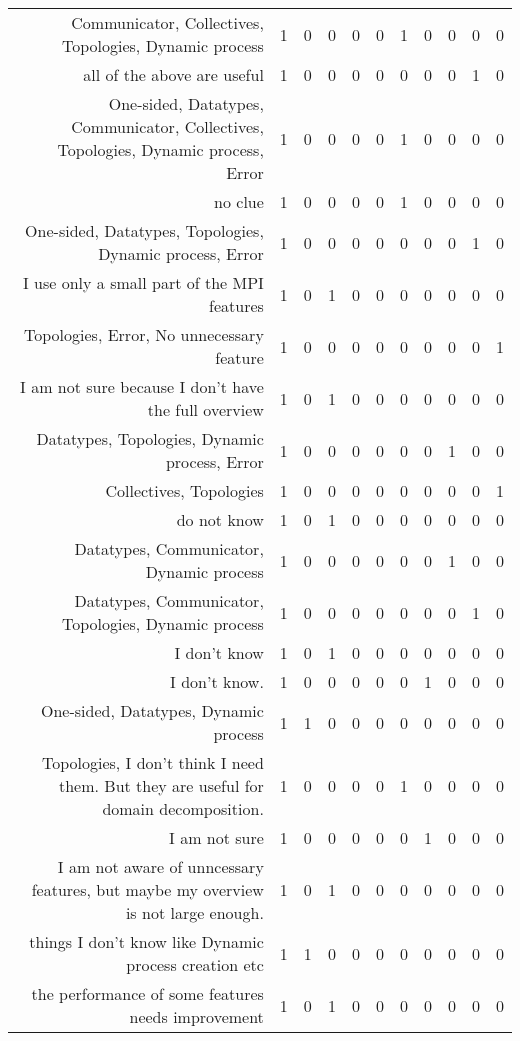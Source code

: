 {\begin{landscape}
\begin{longtable}[htb]{r|c|c|c|c|c|c|c|c|c|c}
{Communicator, Collectives, Topologies, Dynamic process} & 1 & 0 & 0 & 0 & 0 & 1 & 0 & 0 & 0 & 0 \\%
{all of the above are useful} & 1 & 0 & 0 & 0 & 0 & 0 & 0 & 0 & 1 & 0 \\%
{One-sided, Datatypes, Communicator, Collectives, Topologies, Dynamic process, Error} & 1 & 0 & 0 & 0 & 0 & 1 & 0 & 0 & 0 & 0 \\%
{no clue} & 1 & 0 & 0 & 0 & 0 & 1 & 0 & 0 & 0 & 0 \\%
{One-sided, Datatypes, Topologies, Dynamic process, Error} & 1 & 0 & 0 & 0 & 0 & 0 & 0 & 0 & 1 & 0 \\%
{I use only a small part of the MPI features} & 1 & 0 & 1 & 0 & 0 & 0 & 0 & 0 & 0 & 0 \\%
{Topologies, Error, No unnecessary feature} & 1 & 0 & 0 & 0 & 0 & 0 & 0 & 0 & 0 & 1 \\%
{I am not sure because I don't have the full overview} & 1 & 0 & 1 & 0 & 0 & 0 & 0 & 0 & 0 & 0 \\%
{Datatypes, Topologies, Dynamic process, Error} & 1 & 0 & 0 & 0 & 0 & 0 & 0 & 1 & 0 & 0 \\%
{Collectives, Topologies} & 1 & 0 & 0 & 0 & 0 & 0 & 0 & 0 & 0 & 1 \\%
{do not know} & 1 & 0 & 1 & 0 & 0 & 0 & 0 & 0 & 0 & 0 \\%
{Datatypes, Communicator, Dynamic process} & 1 & 0 & 0 & 0 & 0 & 0 & 0 & 1 & 0 & 0 \\%
{Datatypes, Communicator, Topologies, Dynamic process} & 1 & 0 & 0 & 0 & 0 & 0 & 0 & 0 & 1 & 0 \\%
{I don't know} & 1 & 0 & 1 & 0 & 0 & 0 & 0 & 0 & 0 & 0 \\%
{I don't know.} & 1 & 0 & 0 & 0 & 0 & 0 & 1 & 0 & 0 & 0 \\%
{One-sided, Datatypes, Dynamic process} & 1 & 1 & 0 & 0 & 0 & 0 & 0 & 0 & 0 & 0 \\%
{Topologies, I don't think I need them. But they are useful for domain decomposition.} & 1 & 0 & 0 & 0 & 0 & 1 & 0 & 0 & 0 & 0 \\%
{I am not sure} & 1 & 0 & 0 & 0 & 0 & 0 & 1 & 0 & 0 & 0 \\%
{I am not aware of unncessary features, but maybe my overview is not large enough.} & 1 & 0 & 1 & 0 & 0 & 0 & 0 & 0 & 0 & 0 \\%
{things I don't know like Dynamic process creation etc} & 1 & 1 & 0 & 0 & 0 & 0 & 0 & 0 & 0 & 0 \\%
{the performance of some features needs improvement} & 1 & 0 & 1 & 0 & 0 & 0 & 0 & 0 & 0 & 0 \\%

\end{longtable}
\end{landscape}}
